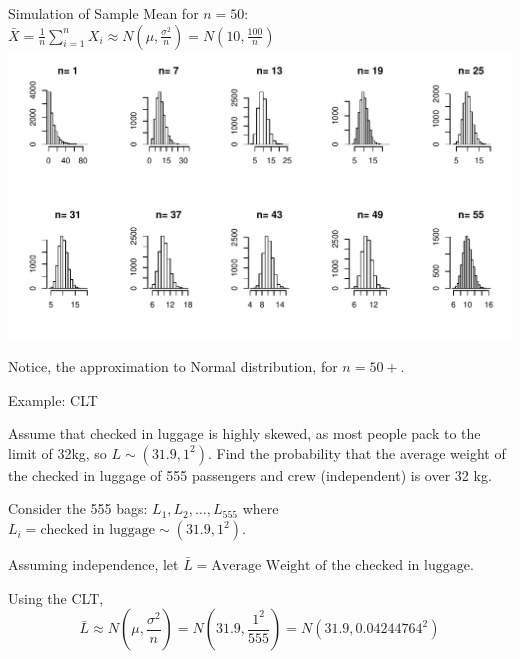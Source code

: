 \documentclass[t,xcolor=pdftex,dvipsnames,table]{beamer}
\makeatletter
\def\maxwidth{ %
  \ifdim\Gin@nat@width>\linewidth
    \linewidth
  \else
    \Gin@nat@width
  \fi
}
\newenvironment{knitrout}{}{} %
\makeatother
\begin{document}
\begin{frame}{}

Simulation of Sample Mean for $n=50$: $\bar{X} = \frac{1}{n} \sum_{i=1}^{n} X_{i}  \approx N(\mu, \frac{\sigma^2}{n}) = N(10,\frac{100}{n})$  \\

\begin{knitrout}
\color{fgcolor}
\includegraphics[width=\maxwidth]{figure/unnamed-chunk-9-1} 

\end{knitrout}

Notice, the approximation to Normal distribution, for $n=50+$.
\end{frame}

\begin{frame}[fragile]{}

\begin{block}{Example: CLT}

Assume that checked in luggage is highly skewed, as most people pack to the limit of 32kg, so $L \sim (31.9, 1^2)$.
Find the probability that the average weight of the checked in luggage of 555 passengers and crew (independent) is over 32 kg.
\end{block}

\vspace{.5cm}
Consider the 555 bags: $L_{1}, L_{2}, \ldots, L_{555}$ where $L_{i} = \mbox{checked in luggage} \sim (31.9, 1^2)$.

\vspace{.5cm}
Assuming independence, let $\bar{L} = \mbox{Average Weight of the checked in luggage}$.

\vspace{.5cm}
Using the CLT,
\[ \bar{L} \approx  N(\mu,\frac{\sigma^2}{n}) = N(31.9, \frac{1^2}{555} ) = N(31.9, 0.04244764^2) \]

\end{frame}
\end{document}

